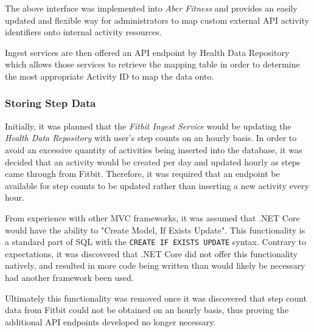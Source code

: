 The above interface was implemented into \textit{Aber Fitness} and provides an easily updated and flexible way for administrators to map custom external API activity identifiers onto internal activity resources. 

Ingest services are then offered an API endpoint by Health Data Repository which allows those services to retrieve the mapping table in order to determine the most appropriate Activity ID to map the data onto.

\subsubsection{Storing Step Data}
Initially, it was planned that the \textit{Fitbit Ingest Service} would be updating the \textit{Health Data Repository} with user's step counts on an hourly basis. In order to avoid an excessive quantity of activities being inserted into the database, it was decided that an activity would be created per day and updated hourly as steps came through from Fitbit. Therefore, it was required that an endpoint be available for step counts to be updated rather than inserting a new activity every hour. 

From experience with other MVC frameworks, it was assumed that .NET Core would have the ability to "Create Model, If Exists Update". This functionality is a standard part of SQL with the \lstinline{CREATE IF EXISTS UPDATE} syntax. Contrary to expectations, it was discovered that .NET Core did not offer this functionality natively, and resulted in more code being written than would likely be necessary had another framework been used. 

Ultimately this functionality was removed once it was discovered that step count data from Fitbit could not be obtained on an hourly basis, thus proving the additional API endpoints developed no longer necessary. 
